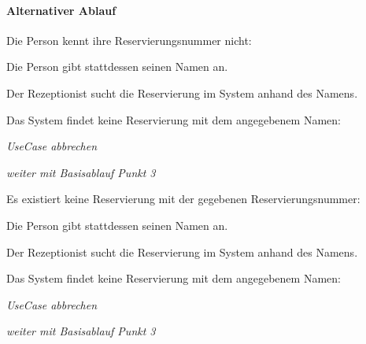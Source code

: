 \paragraph{Alternativer Ablauf}
\begin{longenum}
	\item
	\begin{longenum}
		\item Die Person kennt ihre \Gls{Reservierungsnummer} nicht:
		\begin{longenum}
			\item Die Person gibt stattdessen seinen Namen an.
			\item Der \Gls{Rezeptionist} sucht die \Gls{Reservierung} im System anhand des Namens.
			\begin{longenum}
				\item Das System findet keine \Gls{Reservierung} mit dem angegebenem Namen:
				\begin{longenum}
					\item \emph{UseCase abbrechen}
				\end{longenum}
			\end{longenum}
			\item \emph{weiter mit Basisablauf Punkt 3}
		\end{longenum}
	\end{longenum}
	\item
	\begin{longenum}
		\item Es existiert keine \Gls{Reservierung} mit der gegebenen \Gls{Reservierungsnummer}:
		\begin{longenum}
			\item Die Person gibt stattdessen seinen Namen an.
			\item Der \Gls{Rezeptionist} sucht die \Gls{Reservierung} im System anhand des Namens.
			\begin{longenum}
				\item Das System findet keine \Gls{Reservierung} mit dem angegebenem Namen:
				\begin{longenum}
					\item \emph{UseCase abbrechen}
				\end{longenum}
			\end{longenum}
			\item \emph{weiter mit Basisablauf Punkt 3}
		\end{longenum}
	\end{longenum}
	\item
	\item

\end{longenum}
